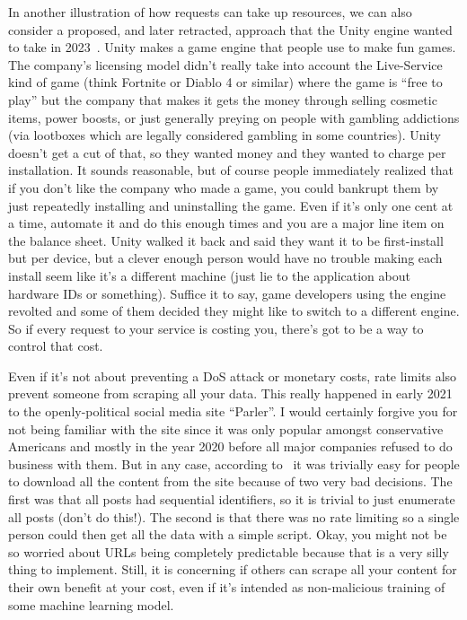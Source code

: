 In another illustration of how requests can take up resources, we can also consider a proposed, and later retracted, approach that the Unity engine wanted to take in 2023~\cite{unity}. Unity makes a game engine that people use to make fun games. The company's licensing model didn't really take into account the Live-Service kind of game (think Fortnite or Diablo 4 or similar) where the game is ``free to play'' but the company that makes it gets the money through selling cosmetic items, power boosts, or just generally preying on people with gambling addictions (via lootboxes which are legally considered gambling in some countries). Unity doesn't get a cut of that, so they wanted money and they wanted to charge per installation. It sounds reasonable, but of course people immediately realized that if you don't like the company who made a game, you could bankrupt them by just repeatedly installing and uninstalling the game. Even if it's only one cent at a time, automate it and do this enough times and you are a major line item on the balance sheet. Unity walked it back and said they want it to be first-install but per device, but a clever enough person would have no trouble making each install seem like it's a different machine (just lie to the application about hardware IDs or something). Suffice it to say, game developers using the engine revolted and some of them decided they might like to switch to a different engine. So if every request to your service is costing you, there's got to be a way to control that cost.


Even if it's not about preventing a DoS attack or monetary costs, rate limits also prevent someone from scraping all your data. This really happened in early 2021 to the openly-political social media site ``Parler''. I would certainly forgive you for not being familiar with the site since it was only popular amongst conservative Americans and mostly in the year 2020 before all major companies refused to do business with them. But in any case, according to~\cite{parler} it was trivially easy for people to download all the content from the site because of two very bad decisions. The first was that all posts had sequential identifiers, so it is trivial to just enumerate all posts (don't do this!). The second is that there was no rate limiting so a single person could then get all the data with a simple script. Okay, you might not be so worried about URLs being completely predictable because that is a very silly thing to implement. Still, it is concerning if others can scrape all your content for their own benefit at your cost, even if it's intended as non-malicious training of some machine learning model. 

